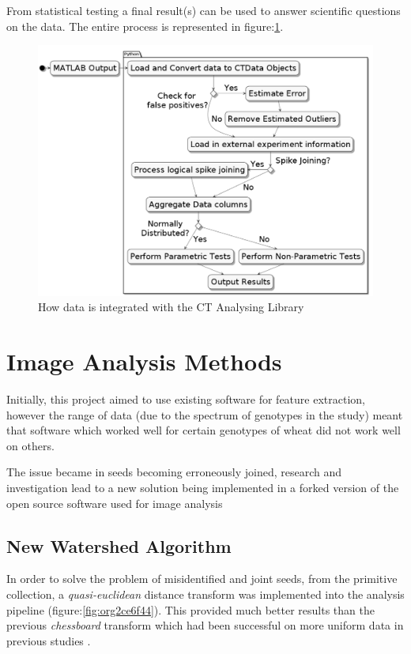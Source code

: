 \documentclass[11pt]{report}
\begin{document}
From statistical testing a final result(s) can be used to answer scientific questions on the data. The entire process is represented in figure:\ref{fig:orgfb2c95b}.
\clearpage
\begin{figure}[htbp]
\centering
\includegraphics[width=18cm]{./images/pipeline.png}
\caption{\label{fig:orgfb2c95b}
How data is integrated with the CT Analysing Library}
\end{figure}

\section{Image Analysis Methods}
\label{sec:org9d0b746}
Initially, this project aimed to use existing software for feature extraction, however the range of data (due to the spectrum of genotypes in the study) meant that software which worked well for certain genotypes of wheat did not work well on others.

The issue became in seeds becoming erroneously joined, research and investigation lead to a new solution being implemented in a forked version of the open source software used for image analysis \cite{Hughes2017}

\subsection{New Watershed Algorithm}
\label{sec:org7a9d959}

In order to solve the problem of misidentified and joint seeds, from the primitive collection,
a  \emph{quasi-euclidean} distance transform was implemented into the analysis pipeline (figure:\ref{fig:org2ce6f44}). This provided much better results than the previous
\emph{chessboard} transform which had been successful on more uniform data in previous studies \cite{Hughes2017}.
\end{document}
